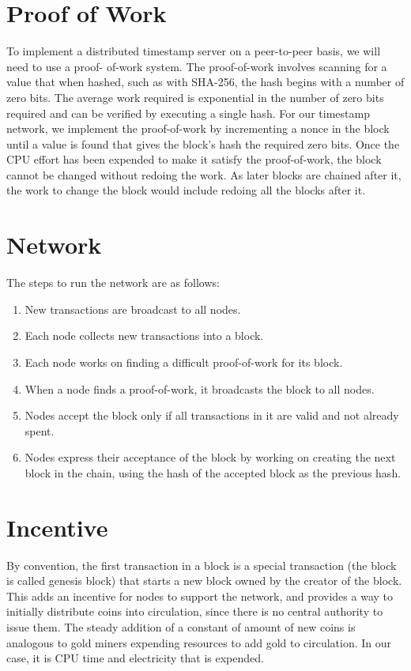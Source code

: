 \section{Proof of Work}
To implement a distributed timestamp server on a peer-to-peer basis, we will need to use a proof-
of-work system. The proof-of-work involves scanning for a value that when hashed, such as with SHA-256, the
hash begins with a number of zero bits. The average work required is exponential in the number
of zero bits required and can be verified by executing a single hash.
For our timestamp network, we implement the proof-of-work by incrementing a nonce in the
block until a value is found that gives the block's hash the required zero bits. Once the CPU
effort has been expended to make it satisfy the proof-of-work, the block cannot be changed
without redoing the work. As later blocks are chained after it, the work to change the block
would include redoing all the blocks after it.

\section{Network}
The steps to run the network are as follows:
\begin{enumerate}
\item New transactions are broadcast to all nodes.
\item Each node collects new transactions into a block.
\item Each node works on finding a difficult proof-of-work for its block.
\item When a node finds a proof-of-work, it broadcasts the block to all nodes.
\item Nodes accept the block only if all transactions in it are valid and not already spent.
\item Nodes express their acceptance of the block by working on creating the next block in the chain, using the hash of the accepted block as the previous hash.
\end{enumerate}

\section{Incentive}
By convention, the first transaction in a block is a special transaction (the block is called genesis block) that starts a new block owned
by the creator of the block. This adds an incentive for nodes to support the network, and provides
a way to initially distribute coins into circulation, since there is no central authority to issue them.
The steady addition of a constant of amount of new coins is analogous to gold miners expending
resources to add gold to circulation. In our case, it is CPU time and electricity that is expended.

